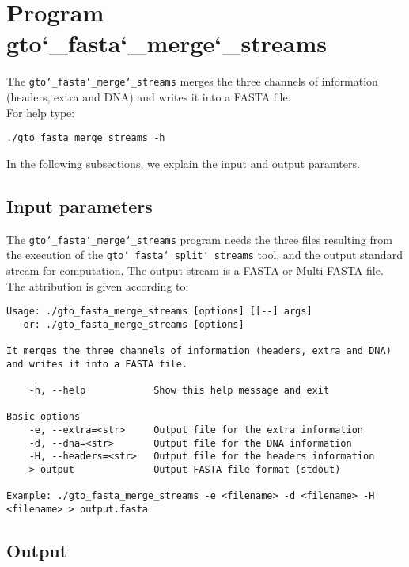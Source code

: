\section{Program gto\char`_fasta\char`_merge\char`_streams}
The \texttt{gto\char`_fasta\char`_merge\char`_streams} merges the three channels of information (headers, extra and DNA) and writes it into a FASTA file. \\
For help type:
\begin{lstlisting}
./gto_fasta_merge_streams -h
\end{lstlisting}
In the following subsections, we explain the input and output paramters.

\subsection*{Input parameters}

The \texttt{gto\char`_fasta\char`_merge\char`_streams} program needs the three files resulting from the execution of the \texttt{gto\char`_fasta\char`_split\char`_streams} tool, and the output standard stream for computation. The output stream is a FASTA or Multi-FASTA file.\\
The attribution is given according to:
\begin{lstlisting}
Usage: ./gto_fasta_merge_streams [options] [[--] args]
   or: ./gto_fasta_merge_streams [options]

It merges the three channels of information (headers, extra and DNA) and writes it into a FASTA file.

    -h, --help            Show this help message and exit

Basic options
    -e, --extra=<str>     Output file for the extra information
    -d, --dna=<str>       Output file for the DNA information
    -H, --headers=<str>   Output file for the headers information
    > output              Output FASTA file format (stdout)

Example: ./gto_fasta_merge_streams -e <filename> -d <filename> -H <filename> > output.fasta
\end{lstlisting}

\subsection*{Output}

